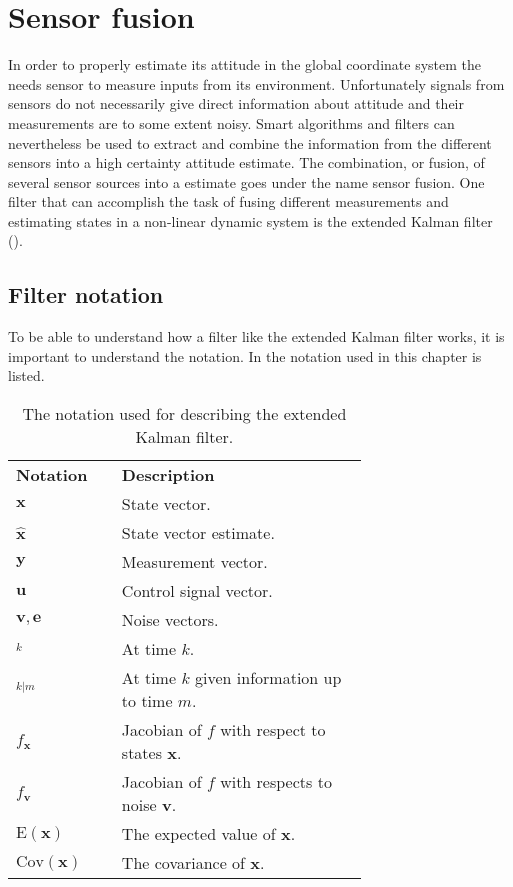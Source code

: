 \chapter{Sensor fusion}\label{cha:sensor_fusion}
In order to properly estimate its attitude in the global coordinate system the \abbrROV needs sensor to measure inputs from its environment.
Unfortunately signals from sensors do not necessarily give direct information about attitude and their measurements are to some extent noisy. Smart algorithms and filters can nevertheless be used to extract and combine the information from the different sensors into a high certainty attitude estimate. The combination, or fusion, of several sensor sources into a estimate goes under the name sensor fusion. One filter that can accomplish the task of fusing different measurements and estimating states in a non-linear dynamic system is the extended Kalman filter (\abbrEKF). 
\section{Filter notation}
To be able to understand how a filter like the extended Kalman filter works, it is important to understand the notation. In   the notation used in this chapter is listed.
 \begin{table}[htbp]
  \centering
  \caption{\label{tab:notationKalman}%
    The notation used for describing the extended Kalman filter.}
    \begin{tabular}{l p{0.7\linewidth}}
    \toprule%
    \textbf{Notation} & \textbf{Description} \\
    \otoprule%
    $\boldsymbol{x}$ & State vector.\\
    $\hat{\boldsymbol{x}}$ & State vector estimate.\\
    $\boldsymbol{y}$ & Measurement vector.\\
    $\boldsymbol{u}$ & Control signal vector.\\
    $\boldsymbol{v},\boldsymbol{e}$ & Noise vectors.\\
    $_k$ & At time $k$.\\
    $_{k|m}$ & At time $k$ given information up to time $m$.\\
    $f_{\boldsymbol{x}}$ & Jacobian of $f$ with respect to states $\boldsymbol{x}$.\\
    $f_{\boldsymbol{v}}$ & Jacobian of $f$ with respects to noise $\boldsymbol{v}$.\\
    $\text{E}(\boldsymbol{x})$ & The expected value of $\boldsymbol{x}$.\\
    $\text{Cov}(\boldsymbol{x})$ & The covariance of $\boldsymbol{x}$.\\
    \bottomrule%
 \end{tabular}
\end{table}

